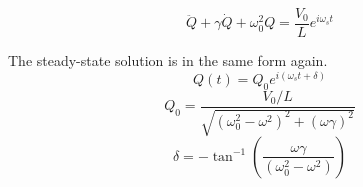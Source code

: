 \documentclass[11pt]{article}
\begin{document}
	\begin{equation}
		\ddot{Q} + \gamma\dot{Q} + \omega_0^2 Q = \frac{V_0}{L}e^{i\omega_s t}
	\end{equation}
	
	The steady-state solution is in the same form again.
	\begin{equation}
		Q(t) = Q_0 e^{i(\omega_s t + \delta)}
	\end{equation}
	\begin{equation}
		Q_0 = \frac{V_0/L}{\sqrt{(\omega_0^2 - \omega^2)^2 + (\omega\gamma)^2}}
	\end{equation}
	\begin{equation}
		\delta = -\tan^{-1}\left(\frac{\omega\gamma}{(\omega_0^2 - \omega^2)}\right)
	\end{equation}

%		
%		


\end{document}
